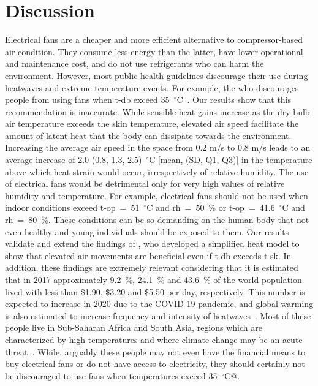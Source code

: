 
\section{Discussion}\label{sec:discussion}

Electrical fans are a cheaper and more efficient alternative to compressor-based air condition.
They consume less energy than the latter, have lower operational and maintenance cost, and do not use refrigerants who can harm the environment.
However, most public health guidelines discourage their use during heatwaves and extreme temperature events.
For example, the \ac{who} discourages people from using fans when \acf{t-db} exceed 35~$^{\circ}$C~\cite{WMO2015}.
Our results show that this recommendation is inaccurate.
While sensible heat gains increase as the dry-bulb air temperature exceeds the skin temperature, elevated air speed facilitate the amount of latent heat that the body can dissipate towards the environment.
Increasing the average air speed in the space from 0.2 m/s to 0.8 m/s leads to an average increase of 2.0 (0.8, 1.3, 2.5)~$^{\circ}$C [mean, (SD, Q1, Q3)] in the temperature above which heat strain would occur, irrespectively of relative humidity.
The use of electrical fans would be detrimental only for very high values of relative humidity and temperature.
For example, electrical fans should not be used when indoor conditions exceed \ac{t-op}~=~51~$^{\circ}$C and \ac{rh}~=~50~\% or \ac{t-op}~=~41.6~$^{\circ}$C and \ac{rh}~=~80~\%.
These conditions can be so demanding on the human body that not even healthy and young individuals should be exposed to them.
Our results validate and extend the findings of , who developed a simplified heat model to show that elevated air movements are beneficial even if \ac{t-db} exceeds \acf{t-sk}.
In addition, these findings are extremely relevant considering that it is estimated that in 2017 approximately 9.2~\%, 24.1~\% and 43.6~\% of the world population lived with less than \$1.90, \$3.20 and \$5.50 per day, respectively.
This number is expected to increase in 2020 due to the COVID-19 pandemic, and global warming is also estimated to increase frequency and intensity of heatwaves~\cite{PovertyO1:online}.
Most of these people live in Sub-Saharan Africa and South Asia, regions which are characterized by high temperatures and where climate change may be an acute threat~\cite{PovertyO1:online}.
While, arguably these people may not even have the financial means to buy electrical fans or do not have access to electricity, they should certainly not be discouraged to use fans when temperatures exceed 35~$^{\circ}$C@.
